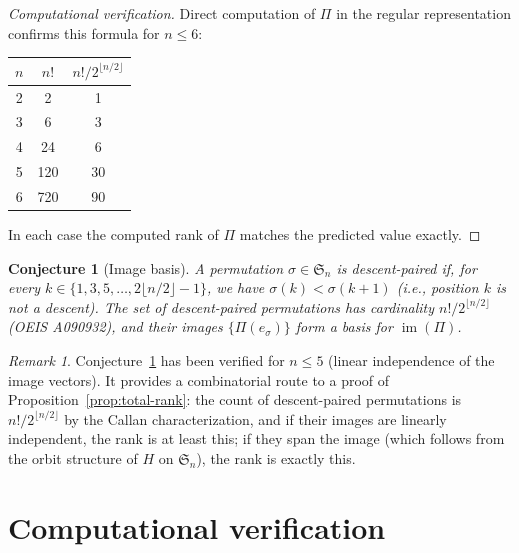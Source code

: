 \documentclass[11pt]{article}
\newtheorem{conjecture}[theorem]{Conjecture}
\theoremstyle{definition}
\theoremstyle{remark}
\newtheorem{remark}[theorem]{Remark}
\newcommand{\Sym}{\mathfrak{S}}
\newcommand{\im}{\operatorname{im}}
\begin{document}
\begin{proof}[Computational verification]
Direct computation of $\Pi$ in the regular representation
confirms this formula for $n \le 6$:

\medskip
\begin{center}
\begin{tabular}{ccc}
\toprule
$n$ & $n!$ & $n!/2^{\lfloor n/2 \rfloor}$ \\
\midrule
2 & 2 & 1 \\
3 & 6 & 3 \\
4 & 24 & 6 \\
5 & 120 & 30 \\
6 & 720 & 90 \\
\bottomrule
\end{tabular}
\end{center}
\medskip

In each case the computed rank of $\Pi$ matches the predicted
value exactly.
\end{proof}

\begin{conjecture}[Image basis]\label{conj:image-basis}
A permutation $\sigma \in \Sym_n$ is \emph{descent-paired} if,
for every $k \in \{1, 3, 5, \ldots, 2\lfloor n/2 \rfloor - 1\}$,
we have $\sigma(k) < \sigma(k+1)$ (i.e., position $k$ is not a
descent). The set of descent-paired permutations has cardinality
$n!/2^{\lfloor n/2 \rfloor}$ (OEIS A090932), and their images
$\{\Pi(e_\sigma)\}$ form a basis for $\im(\Pi)$.
\end{conjecture}

\begin{remark}
Conjecture~\ref{conj:image-basis} has been verified for $n \le 5$
(linear independence of the image vectors). It provides a
combinatorial route to a proof of Proposition~\ref{prop:total-rank}:
the count of descent-paired permutations is $n!/2^{\lfloor n/2\rfloor}$
by the Callan characterization, and if their images are linearly
independent, the rank is at least this; if they span the image
(which follows from the orbit structure of $H$ on $\Sym_n$),
the rank is exactly this.
\end{remark}


\section{Computational verification}\label{sec:computation}
\end{document}
